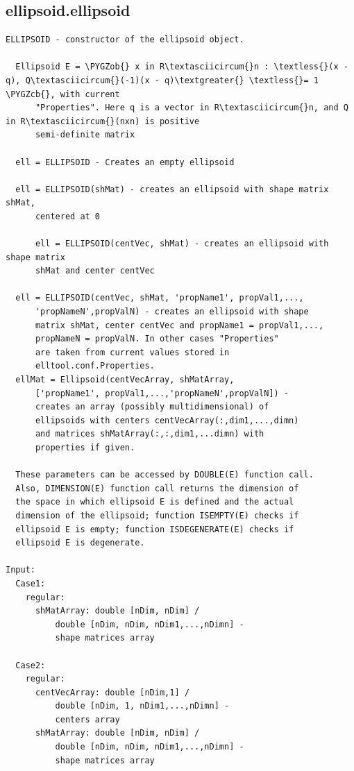 \documentclass[letterpaper,10pt,english]{sphinxmanual}
\def\PYGZob{\char`\{}
\def\PYGZcb{\char`\}}
\begin{document}
\subsection{ellipsoid.ellipsoid}
\label{chap_functions:ellipsoid-ellipsoid}
\begin{Verbatim}[commandchars=\\\{\}]
ELLIPSOID - constructor of the ellipsoid object.

  Ellipsoid E = \PYGZob{} x in R\textasciicircum{}n : \textless{}(x - q), Q\textasciicircum{}(-1)(x - q)\textgreater{} \textless{}= 1 \PYGZcb{}, with current
      "Properties". Here q is a vector in R\textasciicircum{}n, and Q in R\textasciicircum{}(nxn) is positive
      semi-definite matrix

  ell = ELLIPSOID - Creates an empty ellipsoid

  ell = ELLIPSOID(shMat) - creates an ellipsoid with shape matrix shMat,
      centered at 0

      ell = ELLIPSOID(centVec, shMat) - creates an ellipsoid with shape matrix
      shMat and center centVec

  ell = ELLIPSOID(centVec, shMat, 'propName1', propVal1,...,
      'propNameN',propValN) - creates an ellipsoid with shape
      matrix shMat, center centVec and propName1 = propVal1,...,
      propNameN = propValN. In other cases "Properties"
      are taken from current values stored in
      elltool.conf.Properties.
  ellMat = Ellipsoid(centVecArray, shMatArray,
      ['propName1', propVal1,...,'propNameN',propValN]) -
      creates an array (possibly multidimensional) of
      ellipsoids with centers centVecArray(:,dim1,...,dimn)
      and matrices shMatArray(:,:,dim1,...dimn) with
      properties if given.

  These parameters can be accessed by DOUBLE(E) function call.
  Also, DIMENSION(E) function call returns the dimension of
  the space in which ellipsoid E is defined and the actual
  dimension of the ellipsoid; function ISEMPTY(E) checks if
  ellipsoid E is empty; function ISDEGENERATE(E) checks if
  ellipsoid E is degenerate.

Input:
  Case1:
    regular:
      shMatArray: double [nDim, nDim] /
          double [nDim, nDim, nDim1,...,nDimn] -
          shape matrices array

  Case2:
    regular:
      centVecArray: double [nDim,1] /
          double [nDim, 1, nDim1,...,nDimn] -
          centers array
      shMatArray: double [nDim, nDim] /
          double [nDim, nDim, nDim1,...,nDimn] -
          shape matrices array



\end{Verbatim}
\end{document}
